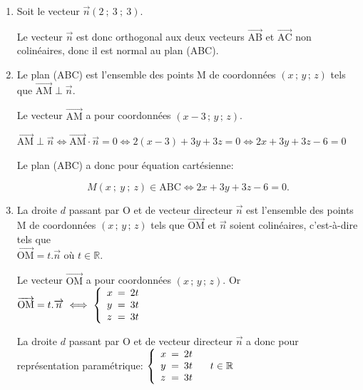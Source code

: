\documentclass[10pt]{article}
\providecommand{\R}{\mathbb{R}}
\providecommand{\vect}[1]{\overrightarrow{#1}}
\providecommand{\vectt}[1]{\overrightarrow{\mathrm{#1}}}
\begin{document}
\begin{enumerate}
\item Soit le vecteur $\vect{n}(2~;~3~;~3)$.


Le vecteur $\vect{n}$ est donc orthogonal aux deux vecteurs $\vectt{AB}$ et $\vectt{AC}$ non colinéaires, donc il est normal au plan (ABC).

\item
Le plan (ABC) est l'ensemble des points M de coordonnées $\left ( x\,;\, y \,;\, z\right )$ tels que $\vectt{AM} \perp \vect{n}$.

Le vecteur $\vectt{AM}$ a pour coordonnées $\left ( x-3\,;\, y \,;\, z\right )$.

$\vectt{AM} \perp \vect{n}
\iff \vectt{AM} \cdot \vect{n} = 0
\iff 2\left (x-3\right ) + 3y + 3z=0
\iff 2x +3y +3z -6=0$

Le plan (ABC) a donc pour équation cartésienne:

\[M(x~;~y~;~z) \in \text{ABC} \iff 2x +3y +3z -6  = 0.\]

\item La droite $d$ passant par O et de vecteur directeur $\vect{n}$ est l'ensemble des points M de coordonnées $\left ( x\,;\, y \,;\, z\right )$ tels que $\vectt{OM}$ et $\vect{n}$ soient colinéaires, c'est-à-dire tels que \\
$\vectt{OM}=t.\vect{n}$ où $t\in\R$.

Le vecteur $\vectt{OM}$ a pour coordonnées $\left ( x\,;\, y \,;\, z\right )$.
Or
$\vectt{OM}=t.\vect{n}
\iff 
\left \{
\begin{array}{l !{=} l}
x & 2t\\
y & 3t\\
z & 3t
\end{array}
\right . $

La droite $d$ passant par O et de vecteur directeur $\vect{n}$ a donc pour représentation paramétrique:
$\left \{
\begin{array}{l !{=} l}
x & 2t\\
y & 3t\\
z & 3t
\end{array}
\right . \quad t\in\R$


\end{enumerate}
\end{document}
